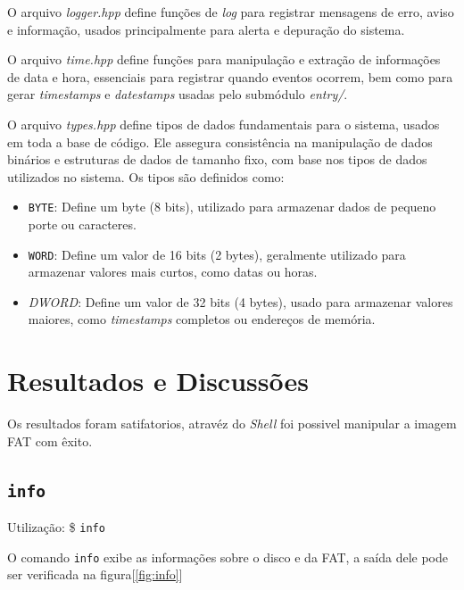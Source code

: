 \documentclass[
    12pt,				%
    oneside,   	        %
    a4paper,			%
    english,			%
    french,				%
    spanish,			%
    brazil,				%
    ]{pacotes/abntex2}
\begin{document}
O arquivo \textit{logger.hpp} define funções de \textit{log} para registrar mensagens de erro, aviso e informação, usados principalmente para alerta e depuração do sistema.

O arquivo \textit{time.hpp} define funções para manipulação e extração de informações de data e hora, essenciais para registrar quando eventos ocorrem, bem como para gerar \textit{timestamps} e \textit{datestamps} usadas pelo submódulo \textit{entry/}.

O arquivo \textit{types.hpp} define tipos de dados fundamentais para o sistema, usados em toda a base de código. Ele assegura consistência na manipulação de dados binários e estruturas de dados de tamanho fixo, com base nos tipos de dados utilizados no sistema. Os tipos são definidos como:

\begin{itemize}
    \item \texttt{BYTE}: Define um byte (8 bits), utilizado para armazenar dados de pequeno porte ou caracteres.
    
    \item \texttt{WORD}: Define um valor de 16 bits (2 bytes), geralmente utilizado para armazenar valores mais curtos, como datas ou horas.
    
    \item \textit{DWORD}: Define um valor de 32 bits (4 bytes), usado para armazenar valores maiores, como \textit{timestamps} completos ou endereços de memória.
\end{itemize}


\graphicspath{ {./figuras/resultados} }

\section{Resultados e Discussões}
\label{sec:resultados}
Os resultados foram satifatorios, atravéz do \textit{Shell} foi possivel manipular a imagem FAT com êxito.


\subsection{\texttt{info}}
\label{subsec:info}
 Utilização: \$ \texttt{info}
 
 O comando \texttt{info} exibe as informações sobre o disco e da FAT, a saída dele pode ser verificada na figura[\ref{fig:info}]
\end{document}
